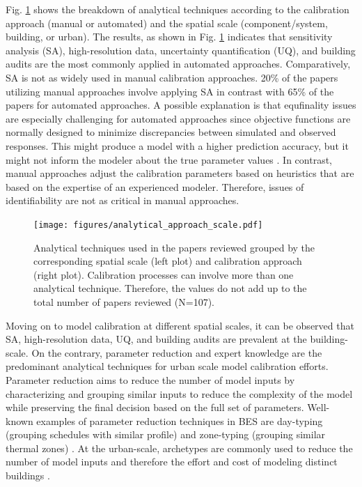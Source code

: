 \documentclass[review]{elsarticle}
\begin{document}
Fig. \ref{fig:analytical_approach} shows the breakdown of analytical techniques according to the calibration approach (manual or automated) and the spatial scale (component/system, building, or urban). The results, as shown in Fig. \ref{fig:analytical_approach} indicates that sensitivity analysis (SA), high-resolution data, uncertainty quantification (UQ), and building audits are the most commonly applied in automated approaches. Comparatively, SA is not as widely used in manual calibration approaches. 20\% of the papers utilizing manual approaches involve applying SA in contrast with 65\% of the papers for automated approaches. A possible explanation is that equfinality issues are especially challenging for automated approaches since objective functions are normally designed to minimize discrepancies between simulated and observed responses. This might produce a model with a higher prediction accuracy, but it might not inform the modeler about the true parameter values \cite{beven2006manifesto}. In contrast, manual approaches adjust the calibration parameters based on heuristics that are based on the expertise of an experienced modeler. Therefore, issues of identifiability are not as critical in manual approaches. 

\begin{figure}[!h]
\centering
\texttt{[image: figures/analytical\_approach\_scale.pdf]}
\caption{Analytical techniques used in the papers reviewed grouped by the corresponding spatial scale (left plot) and calibration approach (right plot). Calibration processes can involve more than one analytical technique. Therefore, the values do not add up to the total number of papers reviewed (N=107).}
\label{fig:analytical_approach}
\end{figure}

Moving on to model calibration at different spatial scales, it can be observed that SA, high-resolution data, UQ, and building audits are prevalent at the building-scale. On the contrary, parameter reduction and expert knowledge are the predominant analytical techniques for urban scale model calibration efforts. Parameter reduction aims to reduce the number of model inputs by characterizing and grouping similar inputs to reduce the complexity of the model while preserving the final decision based on the full set of parameters. Well-known examples of parameter reduction techniques in BES are day-typing (grouping schedules with similar profile) and zone-typing (grouping similar thermal zones) \cite{coakley2014review}. At the urban-scale, archetypes are commonly used to reduce the number of model inputs and therefore the effort and cost of modeling distinct buildings \cite{sokol2017validation, fernandez2020novel, kristensen2020long, tardioli2020methodology, hedegaard2019bottom, wang2020bayesian, chen2020automatic}. 
\end{document}
